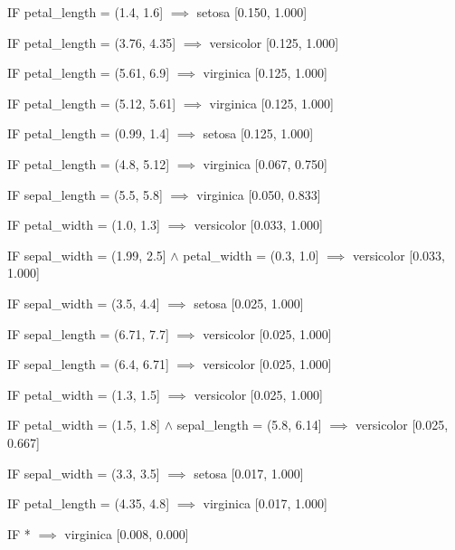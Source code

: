 IF petal_length = (1.4, 1.6] $\implies$ setosa [0.150, 1.000]

IF petal_length = (3.76, 4.35] $\implies$ versicolor [0.125, 1.000]

IF petal_length = (5.61, 6.9] $\implies$ virginica [0.125, 1.000]

IF petal_length = (5.12, 5.61] $\implies$ virginica [0.125, 1.000]

IF petal_length = (0.99, 1.4] $\implies$ setosa [0.125, 1.000]

IF petal_length = (4.8, 5.12] $\implies$ virginica [0.067, 0.750]

IF sepal_length = (5.5, 5.8] $\implies$ virginica [0.050, 0.833]

IF petal_width = (1.0, 1.3] $\implies$ versicolor [0.033, 1.000]

IF sepal_width = (1.99, 2.5] $\land$ petal_width = (0.3, 1.0] $\implies$ versicolor [0.033, 1.000]

IF sepal_width = (3.5, 4.4] $\implies$ setosa [0.025, 1.000]

IF sepal_length = (6.71, 7.7] $\implies$ versicolor [0.025, 1.000]

IF sepal_length = (6.4, 6.71] $\implies$ versicolor [0.025, 1.000]

IF petal_width = (1.3, 1.5] $\implies$ versicolor [0.025, 1.000]

IF petal_width = (1.5, 1.8] $\land$ sepal_length = (5.8, 6.14] $\implies$ versicolor [0.025, 0.667]

IF sepal_width = (3.3, 3.5] $\implies$ setosa [0.017, 1.000]

IF petal_length = (4.35, 4.8] $\implies$ virginica [0.017, 1.000]

IF * $\implies$ virginica [0.008, 0.000]
